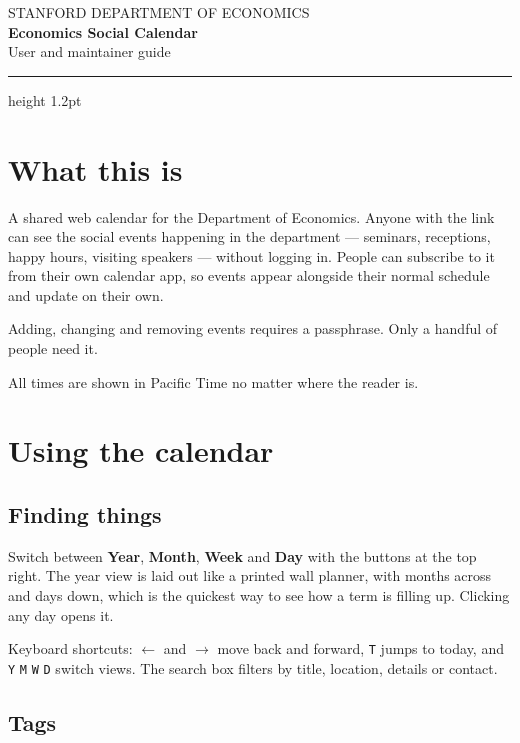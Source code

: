 \documentclass[11pt,a4paper]{article}
\newcommand{\code}[1]{\texttt{\small #1}}
\begin{document}
\begin{flushleft}
{\footnotesize\color{muted}\MakeUppercase{Stanford Department of Economics}}\\[0.2em]
{\LARGE\bfseries\color{ink} Economics Social Calendar}\\[0.4em]
{\color{muted} User and maintainer guide}
\end{flushleft}

\vspace{0.3em}
{\color{cardinal}\hrule height 1.2pt}
\vspace{1.2em}

\section{What this is}

A shared web calendar for the Department of Economics. Anyone with the link can
see the social events happening in the department — seminars, receptions, happy
hours, visiting speakers — without logging in. People can subscribe to it from
their own calendar app, so events appear alongside their normal schedule and
update on their own.

Adding, changing and removing events requires a passphrase. Only a handful of
people need it.

All times are shown in Pacific Time no matter where the reader is.

\section{Using the calendar}

\subsection{Finding things}

Switch between \textbf{Year}, \textbf{Month}, \textbf{Week} and \textbf{Day}
with the buttons at the top right. The year view is laid out like a printed
wall planner, with months across and days down, which is the quickest way to
see how a term is filling up. Clicking any day opens it.

Keyboard shortcuts: \code{$\leftarrow$} and \code{$\rightarrow$} move back and
forward, \code{T} jumps to today, and \code{Y} \code{M} \code{W} \code{D}
switch views. The search box filters by title, location, details or contact.

\subsection{Tags}
\end{document}
